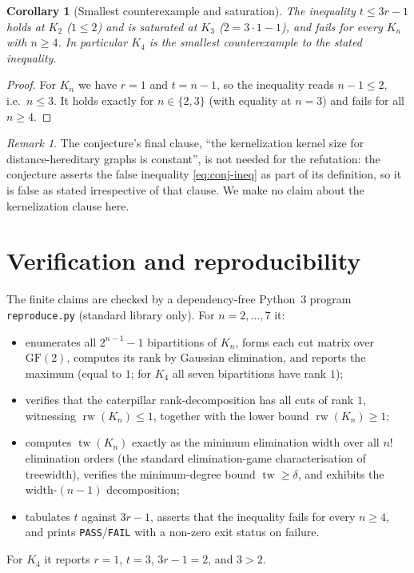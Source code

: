 \documentclass[11pt]{article}
\newtheorem{corollary}[theorem]{Corollary}
\theoremstyle{definition}
\theoremstyle{remark}
\newtheorem{remark}[theorem]{Remark}
\newcommand{\rw}{\operatorname{rw}}
\newcommand{\tw}{\operatorname{tw}}
\begin{document}
\begin{corollary}[Smallest counterexample and saturation]\label{cor:boundary}
The inequality $t \le 3r-1$ holds at $K_2$ ($1 \le 2$) and is saturated at
$K_3$ ($2 = 3\cdot 1 - 1$), and fails for every $K_n$ with $n \ge 4$. In
particular $K_4$ is the smallest counterexample to the stated inequality.
\end{corollary}

\begin{proof}
For $K_n$ we have $r = 1$ and $t = n-1$, so the inequality reads $n - 1 \le 2$,
i.e.\ $n \le 3$. It holds exactly for $n \in \{2,3\}$ (with equality at
$n=3$) and fails for all $n \ge 4$.
\end{proof}

\begin{remark}
The conjecture's final clause, ``the kernelization kernel size for
distance-hereditary graphs is constant'', is not needed for the refutation: the
conjecture asserts the false inequality \eqref{eq:conj-ineq} as part of its
definition, so it is false as stated irrespective of that clause. We make no
claim about the kernelization clause here.
\end{remark}

\section{Verification and reproducibility}

The finite claims are checked by a dependency-free Python~3 program
\texttt{reproduce.py} (standard library only). For $n = 2, \dots, 7$ it:
\begin{itemize}
\item enumerates all $2^{n-1}-1$ bipartitions of $K_n$, forms each cut matrix
over $\mathrm{GF}(2)$, computes its rank by Gaussian elimination, and reports
the maximum (equal to $1$; for $K_4$ all seven bipartitions have rank $1$);
\item verifies that the caterpillar rank-decomposition has all cuts of rank
$1$, witnessing $\rw(K_n) \le 1$, together with the lower bound $\rw(K_n) \ge 1$;
\item computes $\tw(K_n)$ exactly as the minimum elimination width over all
$n!$ elimination orders (the standard elimination-game characterisation of
treewidth), verifies the minimum-degree bound $\tw \ge \delta$, and exhibits
the width-$(n-1)$ decomposition;
\item tabulates $t$ against $3r-1$, asserts that the inequality fails for every
$n \ge 4$, and prints \texttt{PASS}/\texttt{FAIL} with a non-zero exit status on
failure.
\end{itemize}
For $K_4$ it reports $r=1$, $t=3$, $3r-1=2$, and $3 > 2$.
\end{document}
